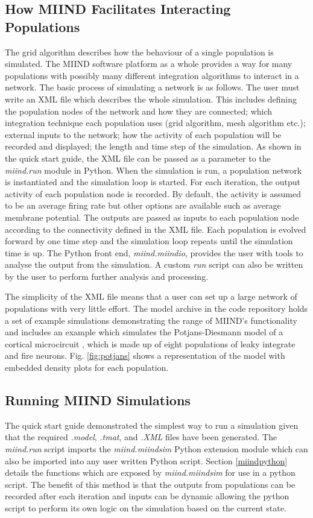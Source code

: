 \documentclass[utf8]{frontiersSCNS} %
\begin{document}
\subsection{How MIIND Facilitates Interacting Populations}
The grid algorithm describes how the behaviour of a single population is simulated. The MIIND software platform as a whole provides a way for many populations with possibly many different integration algorithms to interact in a network. The basic process of simulating a network is as follows. The user must write an XML file which describes the whole simulation. This includes defining the population nodes of the network and how they are connected; which integration technique each population uses (grid algorithm, mesh algorithm etc.); external inputs to the network; how the activity of each population will be recorded and displayed; the length and time step of the simulation. As shown in the quick start guide, the XML file can be passed as a parameter to the \textit{miind.run} module in Python. When the simulation is run, a population network is instantiated and the simulation loop is started. For each iteration, the output activity of each population node is recorded. By default, the activity is assumed to be an average firing rate but other options are available such as average membrane potential. The outputs are passed as inputs to each population node according to the connectivity defined in the XML file. Each population is evolved forward by one time step and the simulation loop repeats until the simulation time is up. The Python front end, \textit{miind.miindio}, provides the user with tools to analyse the output from the simulation. A custom \textit{run} script can also be written by the user to perform further analysis and processing.

The simplicity of the XML file means that a user can set up a large network of populations with very little effort. The model archive in the code repository holds a set of example simulations demonstrating the range of MIIND's functionality and includes an example which simulates the Potjans-Diesmann model of a cortical microcircuit \citep{potjans2014cell}, which is made up of eight populations of leaky integrate and fire neurons. Fig. \ref{fig:potjans} shows a representation of the model with embedded density plots for each population.\\

\subsection{Running MIIND Simulations}
The quick start guide demonstrated the simplest way to run a simulation given that the required \textit{.model}, \textit{.tmat}, and \textit{.XML} files have been generated. The \textit{miind.run} script imports the \textit{miind.miindsim} Python extension module which can also be imported into any user written Python script. Section \ref{miindpython} details the functions which are exposed by \textit{miind.miindsim} for use in a python script. The benefit of this method is that the outputs from populations can be recorded after each iteration and inputs can be dynamic allowing the python script to perform its own logic on the simulation based on the current state.
\end{document}
